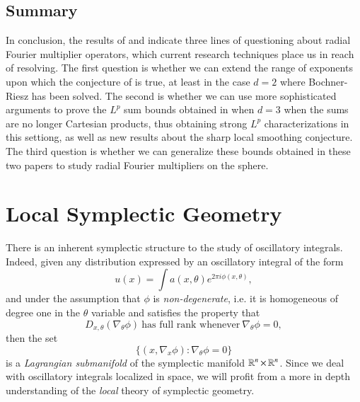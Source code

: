 \section{Summary}

In conclusion, the results of \cite{HeoandNazarovandSeeger} and \cite{Cladek} indicate three lines of questioning about radial Fourier multiplier operators, which current research techniques place us in reach of resolving. The first question is whether we can extend the range of exponents upon which the conjecture of \cite{GarrigosandSeeger} is true, at least in the case $d = 2$ where Bochner-Riesz has been solved. The second is whether we can use more sophisticated arguments to prove the $L^p$ sum bounds obtained in \cite{Cladek} when $d = 3$ when the sums are no longer Cartesian products, thus obtaining strong $L^p$ characterizations in this settiong, as well as new results about the sharp local smoothing conjecture. The third question is whether we can generalize these bounds obtained in these two papers to study radial Fourier multipliers on the sphere. 








\chapter{Local Symplectic Geometry}

There is an inherent symplectic structure to the study of oscillatory integrals. Indeed, given any distribution expressed by an oscillatory integral of the form
%
\[ u(x) = \int a(x,\theta) e^{2 \pi i \phi(x,\theta)}, \]
%
and under the assumption that $\phi$ is \emph{non-degenerate}, i.e. it is homogeneous of degree one in the $\theta$ variable and satisfies the property that
%
\[ D_{x,\theta}(\nabla_\theta \phi)\ \text{has full rank whenever}\ \nabla_\theta \phi = 0, \]%
then the set
%
\[ \{ (x,\nabla_x \phi): \nabla_\theta \phi = 0 \} \]
%
is a \emph{Lagrangian submanifold} of the symplectic manifold $\operatorname{\mathbb{R}}^n \times \operatorname{\mathbb{R}}^n$. Since we deal with oscillatory integrals localized in space, we will profit from a more in depth understanding of the \emph{local} theory of symplectic geometry.


